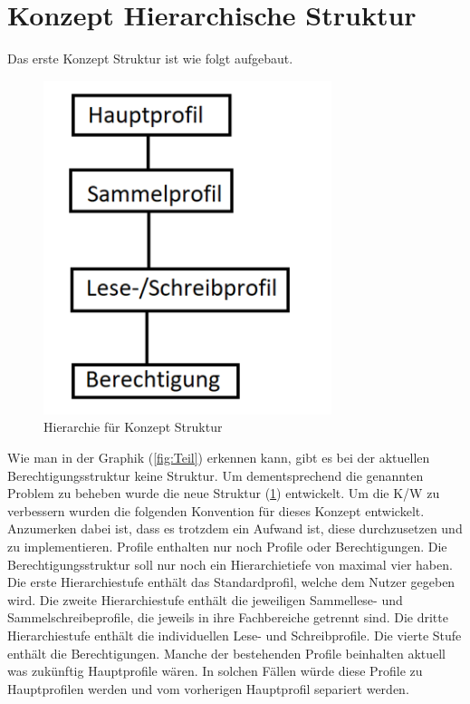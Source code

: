 \section{Konzept Hierarchische Struktur}
\label{sec:chapter04:Struktur}
Das erste Konzept Struktur ist wie folgt aufgebaut.
\begin{figure}[h!]
 \centering
 \includegraphics[width=0.75\textwidth]{gfx/Picture/Hierarchie.PNG}
 \caption{Hierarchie für Konzept Struktur}
 \label{fig:Struktur}
\end{figure}
Wie man in der Graphik (\ref{fig:Teil}) erkennen kann, gibt es bei der aktuellen Berechtigungsstruktur keine Struktur.
Um dementsprechend die genannten Problem zu beheben wurde die neue Struktur (\ref{fig:Struktur}) entwickelt.
Um die \ac{K/W} zu verbessern wurden die folgenden Konvention für dieses Konzept entwickelt.
Anzumerken dabei ist, dass es trotzdem ein Aufwand ist, diese durchzusetzen und zu implementieren.
Profile enthalten nur noch Profile oder Berechtigungen.
Die Berechtigungsstruktur soll nur noch ein Hierarchietiefe von maximal vier haben.
Die erste Hierarchiestufe enthält das Standardprofil, welche dem Nutzer gegeben wird.
Die zweite Hierarchiestufe enthält die jeweiligen Sammellese- und Sammelschreibeprofile, die jeweils in ihre Fachbereiche getrennt sind.
Die dritte Hierarchiestufe enthält die individuellen Lese- und Schreibprofile.
Die vierte Stufe enthält die Berechtigungen.
Manche der bestehenden Profile beinhalten aktuell was zukünftig Hauptprofile wären.
In solchen Fällen würde diese Profile zu Hauptprofilen werden und vom vorherigen Hauptprofil separiert werden.
